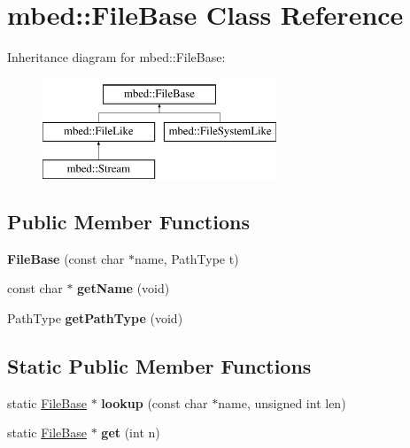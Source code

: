 \hypertarget{classmbed_1_1FileBase}{}\section{mbed\+:\+:File\+Base Class Reference}
\label{classmbed_1_1FileBase}
Inheritance diagram for mbed\+:\+:File\+Base\+:\begin{figure}[H]
\begin{center}
\leavevmode
\includegraphics[height=3.000000cm]{classmbed_1_1FileBase}
\end{center}
\end{figure}
\subsection*{Public Member Functions}
\begin{DoxyCompactItemize}
\item 
{\bfseries File\+Base} (const char $\ast$name, Path\+Type t)\hypertarget{classmbed_1_1FileBase_a8b19f5dfe489eaa641c32a5096c71af1}{}\label{classmbed_1_1FileBase_a8b19f5dfe489eaa641c32a5096c71af1}

\item 
const char $\ast$ {\bfseries get\+Name} (void)\hypertarget{classmbed_1_1FileBase_a9ead232b6645d7ebcf74b65d5ea78a35}{}\label{classmbed_1_1FileBase_a9ead232b6645d7ebcf74b65d5ea78a35}

\item 
Path\+Type {\bfseries get\+Path\+Type} (void)\hypertarget{classmbed_1_1FileBase_a59dd77df265c99a2fa0f7c209d0dba18}{}\label{classmbed_1_1FileBase_a59dd77df265c99a2fa0f7c209d0dba18}

\end{DoxyCompactItemize}
\subsection*{Static Public Member Functions}
\begin{DoxyCompactItemize}
\item 
static \hyperlink{classmbed_1_1FileBase}{File\+Base} $\ast$ {\bfseries lookup} (const char $\ast$name, unsigned int len)\hypertarget{classmbed_1_1FileBase_aa8d8002a2afa83b2e40909a4661f5de7}{}\label{classmbed_1_1FileBase_aa8d8002a2afa83b2e40909a4661f5de7}

\item 
static \hyperlink{classmbed_1_1FileBase}{File\+Base} $\ast$ {\bfseries get} (int n)\hypertarget{classmbed_1_1FileBase_ab7b3a4a842bbd739b49e87151421cc7d}{}\label{classmbed_1_1FileBase_ab7b3a4a842bbd739b49e87151421cc7d}

\end{DoxyCompactItemize}
